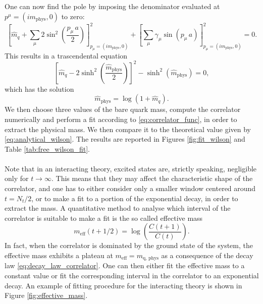 One can now find the pole by imposing the denominator evaluated at $p^\mu =(im_\text{phys}, 0)$ to zero:
\begin{equation*}
    \left[\hat{m}_q + \sum_\mu 2 \sin ^2\left(\frac{p_\mu \, a}{2}\right)\right]^2_{p_\mu = (im_\text{phys}, 0)} + \left[\sum_\mu \gamma_\mu \sin \left(p_\mu \, a\right)\right]^2_{p_\mu = (im_\text{phys}, 0)} = 0.
\end{equation*}
This results in a trascendental equation 
\begin{equation*}
    \left[\hat{m}_q - 2 \sinh^2\left(\frac{\hat{m}_\text{phys}}{2}\right)\right]^2 - \sinh^2\left(\hat{m}_\text{phys}\right) = 0,
\end{equation*}
which has the solution 
\begin{equation}
    \hat{m}_\text{phys} = \log\left(1+\hat{m}_q\right).
    \label{eq:analytical_wilson}
\end{equation}
We then choose three values of the bare quark mass, compute the correlator numerically and perform a fit according to \eqref{eq:correlator_func}, in order to extract the physical mass. We then compare it to the theoretical value given by \eqref{eq:analytical_wilson}. The results are reported in Figures \ref{fig:fit_wilson} and  Table \ref{tab:free_wilson_fit}. \\~\\
Note that in an interacting theory, excited states are, strictly speaking, negligible only for $t \to \infty$. This means that they may affect the characteristic shape of the correlator, and one has to either consider only a smaller window centered around $t=N_t/2$, or to make a fit to a portion of the exponential decay, in order to extract the mass. A quantitative method 
to analyse which interval of the correlator is suitable to make a fit is the so called effective mass \cite{gattringer_LQCD}
\begin{equation}
    m_\text{eff}(t + 1/2) = \log\left(\frac{C(t+1)}{C(t)}\right).
    \label{eq:effective_mass}
\end{equation}
In fact, when the correlator is dominated by the ground state of the system, the effective mass exhibits a plateau at $m_\text{eff} = m_\text{q, phys}$ as a consequence of the decay law \eqref{eq:decay_law_correlator}. One can then either fit the effective mass to a constant value or fit the corresponding interval in the correlator to an exponential decay. 
An example of fitting procedure for the interacting theory is shown in Figure \ref{fig:effective_mass}. \\
